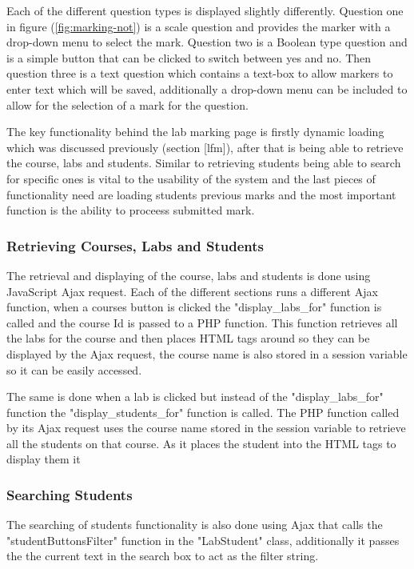 \documentclass[12pt]{article}  %
\begin{document}
Each of the different question types is displayed slightly differently. Question one in figure (\ref{fig:marking-not}) is a scale question and provides the marker with a drop-down menu to select the mark. Question two is a Boolean type question and is a simple button that can be clicked to switch between yes and no. Then question three is a text question which contains a text-box to allow markers to enter text which will be saved, additionally a drop-down menu can be included to allow for the selection of a mark for the question. 

The key functionality behind the lab marking page is firstly dynamic loading which was discussed previously (section [lfm]), after that is being able to retrieve the course, labs and students. Similar to retrieving students being able to search for specific ones is vital to the usability of the system and the last pieces of functionality need are loading students previous marks and the most important function is the ability to proceess submitted mark.

\subsubsection{Retrieving Courses, Labs and Students}

The retrieval and displaying of the course, labs and students is done using JavaScript Ajax request. Each of the different sections runs a different Ajax function, when a courses button is clicked the "display\_labs\_for" function is called and the course Id is passed to a PHP function. This function retrieves all the labs for the course and then places HTML tags around so they can be displayed by the Ajax request, the course name is also stored in a session variable so it can be easily accessed. 

The same is done when a lab is clicked but instead of the "display\_labs\_for" function the "display\_students\_for" function is called. The PHP function called by its Ajax request uses the course name stored in the session variable to retrieve all the students on that course. As it places the student into the HTML tags to display them it 


\subsubsection{Searching Students}
The searching of students functionality is also done using Ajax that calls the "studentButtonsFilter" function in the "LabStudent" class, additionally it passes the the current text in the search box to act as the filter string. 
\end{document}
